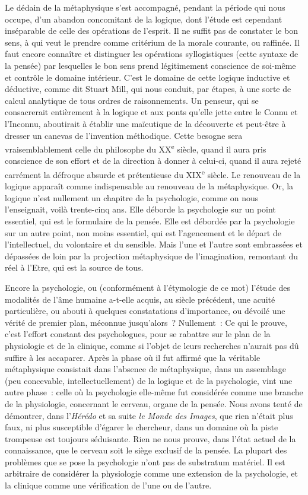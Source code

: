 \documentclass[french,twoside]{book} %
\begin{document}
Le dédain de la métaphysique s’est accompagné, pendant la période qui nous occupe, d’un abandon concomitant de la logique, dont l’étude est cependant inséparable de celle des opérations de l’esprit. Il ne suffit pas de constater le bon sens, à qui veut le prendre comme critérium de la morale courante, ou raffinée. Il faut encore connaître et distinguer les opérations syllogistiques (cette syntaxe de la pensée) par lesquelles le bon sens prend légitimement conscience de soi-même et contrôle le domaine intérieur. C’est le domaine de cette logique inductive et déductive, comme dit Stuart Mill, qui nous conduit, par étapes, à une sorte de calcul analytique de tous ordres de raisonnements. Un penseur, qui se consacrerait entièrement à la logique et aux ponts qu’elle jette entre le Connu et l’Inconnu, aboutirait à établir une maïeutique de la découverte et peut-être à dresser un canevas de l’invention méthodique. Cette besogne sera vraisemblablement celle du philosophe du XX\textsuperscript{e} siècle, quand il aura pris conscience de son effort et de la direction à donner à celui-ci, quand il aura rejeté carrément la défroque absurde et prétentieuse du XIX\textsuperscript{e} siècle. Le renouveau de la logique apparaît comme indispensable au renouveau de la métaphysique. Or, la logique n’est nullement un chapitre de la psychologie, comme on nous l’enseignait, voilà trente-cinq ans. Elle déborde la psychologie sur un point essentiel, qui est le formulaire de la pensée. Elle est débordée par la psychologie sur un autre point, non moins essentiel, qui est l’agencement et le départ de l’intellectuel, du volontaire et du sensible. Mais l’une et l’autre sont embrassées et dépassées de loin par la projection métaphysique de l’imagination, remontant du réel à l’Etre, qui est la source de tous.\par
Encore la psychologie, ou (conformément à l’étymologie de ce mot) l’étude des modalités de l’âme humaine a-t-elle acquis, au siècle précédent, une acuité particulière, ou abouti à quelques constatations d’importance, ou dévoilé une vérité de premier plan, méconnue jusqu’alors ? Nullement : Ce qui le prouve, c’est l’effort constant des psychologues, pour se rabattre sur le plan de la physiologie et de la clinique, comme si l’objet de leurs recherches n’aurait pas dû suffire à les accaparer. Après la phase où il fut affirmé que la véritable métaphysique consistait dans l’absence de métaphysique, dans un assemblage (peu concevable, intellectuellement) de la logique et de la psychologie, vint une autre phase : celle où la psychologie elle-même fut considérée comme une branche de la physiologie, concernant le cerveau, organe de la pensée. Nous avons tenté de démontrer, dans l’{\itshape Hérédo} et sa suite {\itshape le Monde des Images}, que rien n’était plus faux, ni plus susceptible d’égarer le chercheur, dans un domaine où la piste trompeuse est toujours séduisante. Rien ne nous prouve, dans l’état actuel de la connaissance, que le cerveau soit le siège exclusif de la pensée. La plupart des problèmes que se pose la psychologie n’ont pas de substratum matériel. Il est arbitraire de considérer la physiologie comme une extension de la psychologie, et la clinique comme une vérification de l’une ou de l’autre.\par
\end{document}
